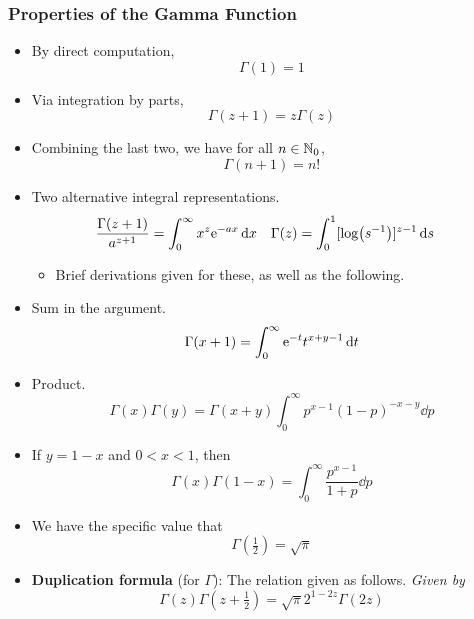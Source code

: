 \documentclass[../finalProject.tex]{subfiles}
\begin{document}
\subsubsection{Properties of the Gamma Function}\label{ss2:1.4.1}
\begin{itemize}
    \item By direct computation,
    \begin{equation*}
        \Gamma(1) = 1
    \end{equation*}
    \item Via integration by parts,
    \begin{equation*}
        \Gamma(z+1) = z\Gamma(z)
    \end{equation*}
    \item Combining the last two, we have for all $n\in\N_0$,
    \begin{equation*}
        \Gamma(n+1) = n!
    \end{equation*}
    \item Two alternative integral representations.
    \begin{align*}
        \frac{\Gamma(z+1)}{a^{z+1}} &= \int_0^\infty x^z\e[-ax]\dd{x}&
        \Gamma(z) &= \int_0^1[\log(s^{-1})]^{z-1}\dd{s}
    \end{align*}
    \begin{itemize}
        \item Brief derivations given for these, as well as the following.
    \end{itemize}
    \item Sum in the argument.
    \begin{equation*}
        \Gamma(x+1) = \int_0^\infty\e[-t]t^{x+y-1}\dd{t}
    \end{equation*}
    \item Product.
    \begin{equation*}
        \Gamma(x)\Gamma(y) = \Gamma(x+y)\int_0^\infty p^{x-1}(1-p)^{-x-y}\dd{p}
    \end{equation*}
    \item If $y=1-x$ and $0<x<1$, then
    \begin{equation*}
        \Gamma(x)\Gamma(1-x) = \int_0^\infty\frac{p^{x-1}}{1+p}\dd{p}
    \end{equation*}
    \item We have the specific value that
    \begin{equation*}
        \Gamma(\tfrac{1}{2}) = \sqrt{\pi}
    \end{equation*}
    \item \textbf{Duplication formula} (for $\Gamma$): The relation given as follows. \emph{Given by}
    \begin{equation*}
        \Gamma(z)\Gamma(z+\tfrac{1}{2}) = \sqrt{\pi}2^{1-2z}\Gamma(2z)
    \end{equation*}
\end{itemize}
\end{document}
